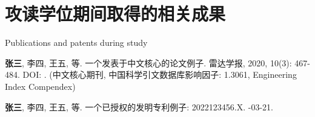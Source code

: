 \chapter{攻读学位期间取得的相关成果}{Publications and patents during study}


\begin{results}
  \item 
  \textbf{张三}, 李四, 王五, 等.
  \newblock 一个发表于中文核心的论文例子\allowbreak[J/OL].
  \newblock 雷达学报, 2020, 10\allowbreak (3): 467-484.
  \newblock DOI: .
  \newblock (中文核心期刊, 中国科学引文数据库影响因子: 1.3061, Engineering Index Compendex)
\end{results}



\begin{results}
  \item 
  \textbf{张三}, 李四, 王五, 等.
  \newblock 一个已授权的发明专利例子: 2022123456.X\allowbreak[P].
  -03-21.
\end{results}